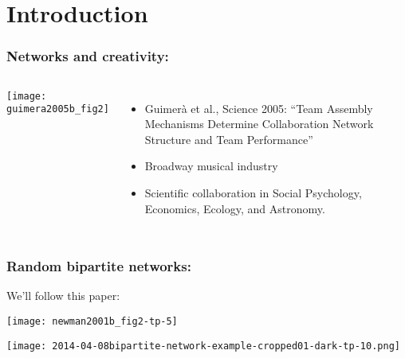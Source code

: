 

\section{Introduction}





\begin{frame}
  \frametitle{Networks and creativity:}

  \begin{columns}
    \texttt{[image: guimera2005b\_fig2]}
    \begin{itemize}
    \item
      Guimer\`{a} et al., Science 2005:\cite{guimera2005b}
      ``Team Assembly Mechanisms Determine Collaboration Network Structure and Team Performance''
    \item 
      Broadway musical industry
    \item 
      Scientific collaboration in Social Psychology, Economics, Ecology, and Astronomy.
    \end{itemize}
  \end{columns}

\end{frame}



\begin{frame}
  \frametitle{Random bipartite networks:}

  \begin{block}{We'll follow this paper:}
  \end{block}

  \begin{center}
    \texttt{[image: newman2001b\_fig2-tp-5]}
  \end{center}

\end{frame}

\begin{center}
  \begin{frame}
    \texttt{[image: 2014-04-08bipartite-network-example-cropped01-dark-tp-10.png]}
  \end{frame}
\end{center}



